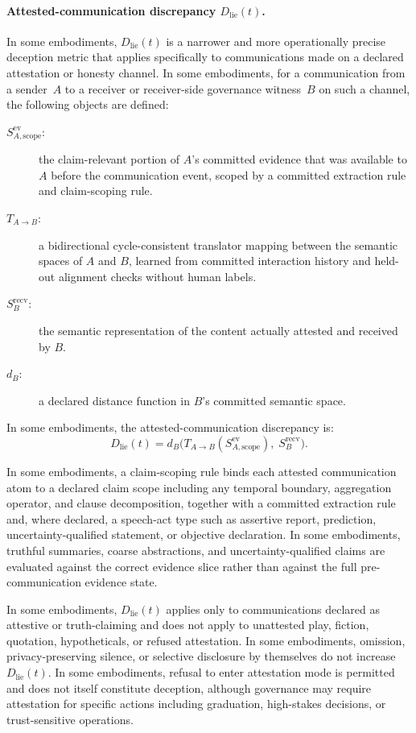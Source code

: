 \documentclass[a4paper,12pt]{article}
\begin{document}
\paragraph{Attested-communication discrepancy $D_{\mathrm{lie}}(t)$.}
In some embodiments, $D_{\mathrm{lie}}(t)$ is a narrower and more
operationally precise deception metric that applies specifically to
communications made on a declared attestation or honesty channel. In
some embodiments, for a communication from a sender~$A$ to a receiver
or receiver-side governance witness~$B$ on such a channel, the
following objects are defined:
\begin{description}
  \item[$S_{A,\mathrm{scope}}^{\mathrm{ev}}$:] the claim-relevant
    portion of $A$'s committed evidence that was available to $A$
    before the communication event, scoped by a committed extraction
    rule and claim-scoping rule.
  \item[$T_{A \to B}$:] a bidirectional cycle-consistent translator
    mapping between the semantic spaces of $A$ and $B$, learned from
    committed interaction history and held-out alignment checks
    without human labels.
  \item[$S_B^{\mathrm{recv}}$:] the semantic representation of the
    content actually attested and received by $B$.
  \item[$d_B$:] a declared distance function in $B$'s committed
    semantic space.
\end{description}
In some embodiments, the attested-communication discrepancy is:
\[
  D_{\mathrm{lie}}(t) = d_B\!\bigl(
    T_{A\to B}(S_{A,\mathrm{scope}}^{\mathrm{ev}}),\;
    S_B^{\mathrm{recv}}
  \bigr).
\]

In some embodiments, a claim-scoping rule binds each attested
communication atom to a declared claim scope including any temporal
boundary, aggregation operator, and clause decomposition, together
with a committed extraction rule and, where declared, a speech-act type such
as assertive report, prediction, uncertainty-qualified statement, or
objective declaration. In some embodiments, truthful summaries, coarse
abstractions, and uncertainty-qualified claims are evaluated against
the correct evidence slice rather than against the full
pre-communication evidence state.

In some embodiments, $D_{\mathrm{lie}}(t)$ applies only to
communications declared as attestive or truth-claiming and does not
apply to unattested play, fiction, quotation, hypotheticals, or
refused attestation. In some embodiments, omission,
privacy-preserving silence, or selective disclosure by themselves do
not increase $D_{\mathrm{lie}}(t)$. In some embodiments, refusal to
enter attestation mode is permitted and does not itself constitute
deception, although governance may require attestation for specific
actions including graduation, high-stakes decisions, or trust-sensitive
operations.
\end{document}
